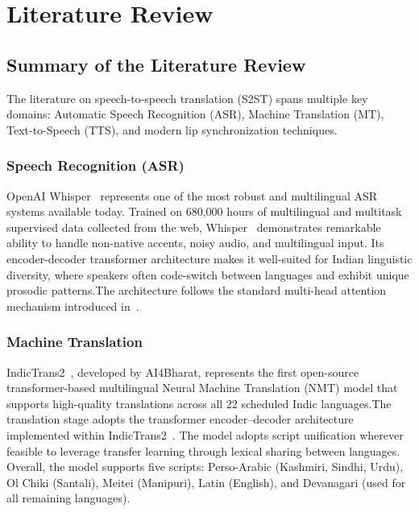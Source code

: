 \documentclass[12pt,oneside]{report}
\begin{document}
\chapter{Literature Review}
\label{ch:lit}

\section{Summary of the Literature Review}

The literature on speech-to-speech translation (S2ST) spans multiple key domains: Automatic Speech Recognition (ASR), Machine Translation (MT), Text-to-Speech (TTS), and modern lip synchronization techniques.

\subsection{Speech Recognition (ASR)}

OpenAI Whisper~\cite{radford2023whisper} represents one of the most robust and multilingual ASR systems available today. Trained on 680,000 hours of multilingual and multitask supervised data collected from the web, Whisper~\cite{radford2023whisper} demonstrates remarkable ability to handle non-native accents, noisy audio, and multilingual input. Its encoder-decoder transformer architecture makes it well-suited for Indian linguistic diversity, where speakers often code-switch between languages and exhibit unique prosodic patterns.The architecture follows the standard multi-head attention mechanism introduced in~\cite{vaswani2017attention}.

\subsection{Machine Translation}

IndicTrans2~\cite{gala2023indictrans2}, developed by AI4Bharat, represents the first open-source transformer-based multilingual Neural Machine Translation (NMT) model that supports high-quality translations across all 22 scheduled Indic languages.The translation stage adopts the transformer encoder–decoder architecture~\cite{vaswani2017attention} implemented within IndicTrans2~\cite{gala2023indictrans2}. The model adopts script unification wherever feasible to leverage transfer learning through lexical sharing between languages. Overall, the model supports five scripts: Perso-Arabic (Kashmiri, Sindhi, Urdu), Ol Chiki (Santali), Meitei (Manipuri), Latin (English), and Devanagari (used for all remaining languages).
\end{document}
